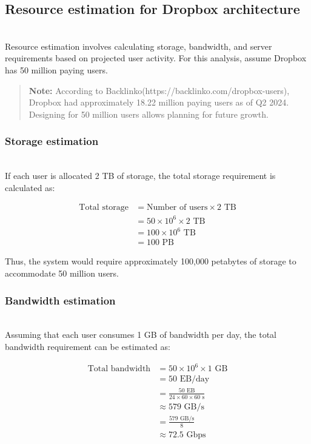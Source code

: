 \subsection{Resource estimation for Dropbox architecture}\label{a6EOvVej4C14Y3smSMzcu}
\\
Resource estimation involves calculating storage, bandwidth, and server requirements based on projected user activity. For this analysis, assume Dropbox has 50 million paying users.
\begin{quote}
\textbf{Note:} According to Backlinko(https://backlinko.com/dropbox-users), Dropbox had approximately 18.22 million paying users as of Q2 2024. Designing for 50 million users allows planning for future growth.
\end{quote}
\subsubsection{Storage estimation}\label{-VJ8fUYeuguHQiicz1s8Q}
\\
If each user is allocated 2 TB of storage, the total storage requirement is calculated as:

\begin{align*}
\text{Total storage} &= \text{Number of users} \times 2 \text{ TB} \\
&= 50 \times 10^6 \times 2 \text{ TB} \\
&= 100 \times 10^6 \text{ TB} \\
&= 100 \text{ PB}
\end{align*}


Thus, the system would require approximately 100,000 petabytes of storage to accommodate 50 million users.

\subsubsection{Bandwidth estimation}\label{p26uukah1nxvr-GkdXZ0p}
\\
Assuming that each user consumes 1 GB of bandwidth per day, the total bandwidth requirement can be estimated as:

\begin{align*}
\text{Total bandwidth} 
&= 50 \times 10^6 \times 1 \text{ GB} \\
&= 50 \text{ EB/day} \\
&= \frac{50 \text{ EB}}{24 \times 60 \times 60 \text{ s}} \\
&\approx 579 \text{ GB/s} \\
&= \frac{579 \text{ GB/s}}{8} \\
&\approx 72.5 \text{ Gbps}
\end{align*}


